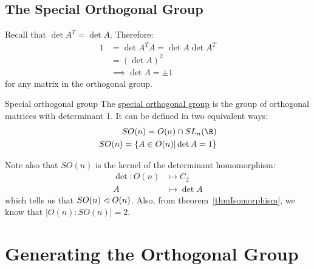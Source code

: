 \documentclass[../Main.tex]{subfiles}
\begin{document}
\subsection{The Special Orthogonal Group}
Recall that $\det{A^T} = \det{A}$. Therefore:
\begin{align*}
    1 &= \det{A^T A} = \det{A}\det{A^T} \\
    &= (\det{A})^2 \\
    &\implies \det{A} = \pm 1
\end{align*}
for any matrix in the orthogonal group.
\begin{definition}{Special orthogonal group}
    The \underline{special orthogonal group} is the group of orthogonal matrices with determinant 1. It can be defined in two equivalent ways:
    \begin{eqnarray*}
        SO(n) = O(n) \cap SL_n(\R) \\
        SO(n) = \{A \in O(n) | \det{A} = 1\}
    \end{eqnarray*}
\end{definition}
Note also that $SO(n)$ is the kernel of the determinant homomorphism:
\begin{align*}
    \det{} : O(n) &\mapsto C_2 \\
    A &\mapsto \det{A}
\end{align*}
which tells us that $SO(n) \vartriangleleft O(n)$. Also, from theorem~\ref{thmIsomorphism}, we know that $|O(n) : SO(n)| = 2$.
\section{Generating the Orthogonal Group}
\end{document}
